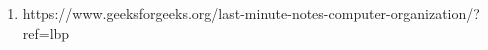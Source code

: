 
\begin{enumerate}
    \item https://www.geeksforgeeks.org/last-minute-notes-computer-organization/?ref=lbp
\end{enumerate}
